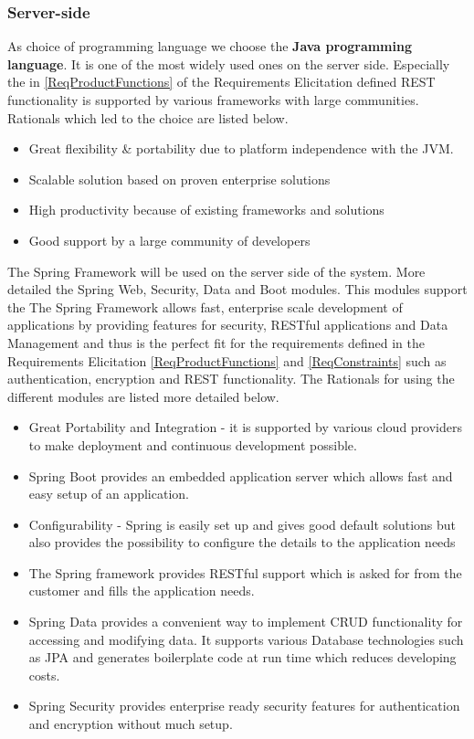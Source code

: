 \documentclass[a4paper,11pt]{article}
\begin{document}
\subsubsection{Server-side}
As choice of programming language we choose the \textbf{Java programming language}. It is one of the most widely used ones on the server side. Especially the  in \ref{ReqProductFunctions} of the Requirements Elicitation defined REST functionality is supported by various frameworks with large communities. Rationals which led to the choice are listed below.
\begin{itemize}
\item Great flexibility \& portability due to platform independence with the JVM.
\item Scalable solution based on proven enterprise solutions
\item High productivity because of existing frameworks and solutions
\item Good support by a large community of developers
\end{itemize}

The Spring Framework will be used on the server side of the system.
More detailed the Spring Web, Security, Data and Boot modules. This modules support the 
The Spring Framework allows fast, enterprise scale development of applications by providing features for security, RESTful applications and Data Management and thus is the perfect fit for the requirements defined in the Requirements Elicitation \ref{ReqProductFunctions} and \ref{ReqConstraints} such as authentication, encryption and REST functionality. The Rationals for using the different modules are listed more detailed below.
\begin{itemize}
\item Great Portability and Integration - it is supported by various cloud providers to make deployment and continuous development possible.
\item Spring Boot provides an embedded application server which allows fast and easy setup of an application.
\item Configurability - Spring is easily set up and gives good default solutions but also provides the possibility to configure the details to the application needs
\item The Spring framework provides RESTful support which is asked for from the customer and fills the application needs.
\item Spring Data provides a convenient way to implement CRUD functionality for accessing and modifying data. It supports various Database technologies such as JPA and generates boilerplate code at run time which reduces developing costs.
\item Spring Security provides enterprise ready security features for authentication and encryption without much setup.
\end{itemize}
\end{document}
